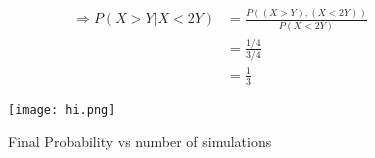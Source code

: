 \documentclass{article}
\begin{document}
\begin{equation} 
\begin{split}
\Rightarrow P (X>Y|X<2Y) & = \frac{P ((X>Y), (X<2Y))}{P(X<2Y)} \\
 & = \frac{1/4}{3/4} \\
 & = \frac{1}{3}
\end{split}
\end{equation}

\begin{figure}[h]
    \centering
    \texttt{[image: hi.png]}
    \caption{Final Probability vs number of simulations}
\end{figure}
\end{document}
